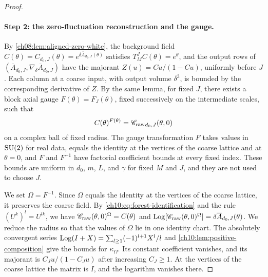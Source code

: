 \begin{proof}
\paragraph{Step 2: the zero-fluctuation reconstruction and the gauge.}
By \cref{ch08:lem:aligned-zero-white}, the background field $C(\theta)=C_{d_0,J}(\theta)=e^{\delta\overline A_{d_0,J}(\theta)}$ satisfies $T_M^JC(\theta)=e^\theta$, and the output rows of $(\overline A_{d_0,J},\nabla_\delta\overline A_{d_0,J})$ have the majorant $Z(u)=Cu/(1-Cu)$, uniformly before $J$. Each column at a coarse input, with output volume $\delta^3$, is bounded by the corresponding derivative of $Z$. By the same lemma, for fixed $J$, there exists a block axial gauge $F(\theta)=F_J(\theta)$, fixed successively on the intermediate scales, such that
\begin{equation}\label{ch10:eq:forest-identification}
 C(\theta)^{F(\theta)}={\mathscr C_{\mathrm{raw}}}_{d_0,J}(\theta,0)
\end{equation}
on a complex ball of fixed radius. The gauge transformation $F$ takes values in $\mathrm{SU}(2)$ for real data, equals the identity at the vertices of the coarse lattice and at $\theta=0$, and $F$ and $F^{-1}$ have factorial coefficient bounds at every fixed index. These bounds are uniform in $d_0$, $m$, $L$, and $\gamma$ for fixed $M$ and $J$, and they are not used to choose $J$.

We set $\Omega=F^{-1}$. Since $\Omega$ equals the identity at the vertices of the coarse lattice, it preserves the coarse field. By \eqref{ch10:eq:forest-identification} and the rule $(U^k)^l=U^{lk}$, we have $\mathscr C_{\mathrm{raw}}(\theta,0)^{\Omega}=C(\theta)$ and $\operatorname{Log}[\mathscr C_{\mathrm{raw}}(\theta,0)^\Omega]=\delta\overline A_{d_0,J}(\theta)$. We reduce the radius so that the values of $\Omega$ lie in one identity chart. The absolutely convergent series $\operatorname{Log}(I+X)=\sum_{l\ge1}(-1)^{l+1}X^l/l$ and \cref{ch10:lem:positive-composition} give the bounds for $\kappa_\Omega$. Its constant coefficient vanishes, and its majorant is $C_Ju/(1-C_Ju)$ after increasing $C_J\ge1$. At the vertices of the coarse lattice the matrix is $I$, and the logarithm vanishes there.


\end{proof}
